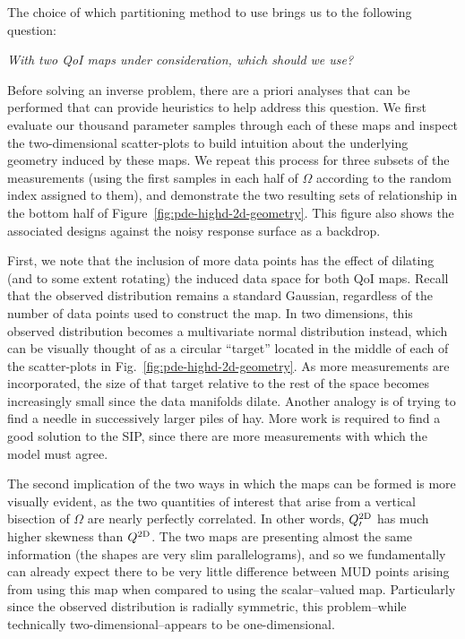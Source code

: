 The choice of which partitioning method to use brings us to the following question:
\begin{center}
\emph{With two QoI maps under consideration, which should we use?}
\end{center}

Before solving an inverse problem, there are a priori analyses that can be performed that can provide heuristics to help address this question.
We first evaluate our thousand parameter samples through each of these maps and inspect the two-dimensional scatter-plots to build intuition about the underlying geometry induced by these maps.
We repeat this process for three subsets of the measurements (using the first samples in each half of $\Omega$ according to the random index assigned to them), and demonstrate the two resulting sets of relationship in the bottom half of Figure~\ref{fig:pde-highd-2d-geometry}.
This figure also shows the associated designs against the noisy response surface as a backdrop.

First, we note that the inclusion of more data points has the effect of dilating (and to some extent rotating) the induced data space for both QoI maps.
Recall that the observed distribution remains a standard Gaussian, regardless of the number of data points used to construct the map.
In two dimensions, this observed distribution becomes a multivariate normal distribution instead, which can be visually thought of as a circular ``target'' located in the middle of each of the scatter-plots in Fig.~\ref{fig:pde-highd-2d-geometry}.
As more measurements are incorporated, the size of that target relative to the rest of the space becomes increasingly small since the data manifolds dilate.
Another analogy is of trying to find a needle in successively larger piles of hay.
More work is required to find a good solution to the SIP, since there are more measurements with which the model must agree.

The second implication of the two ways in which the maps can be formed is more visually evident, as the two quantities of interest that arise from a vertical bisection of $\Omega$ are nearly perfectly correlated.
In other words, $Q^\text{2D}_\prime$ has much higher skewness than $Q^\text{2D}$.
The two maps are presenting almost the same information (the shapes are very slim parallelograms), and so we fundamentally can already expect there to be very little difference between MUD points arising from using this map when compared to using the scalar--valued map.
Particularly since the observed distribution is radially symmetric, this problem\---while technically two-dimensional\---appears to be one-dimensional.


